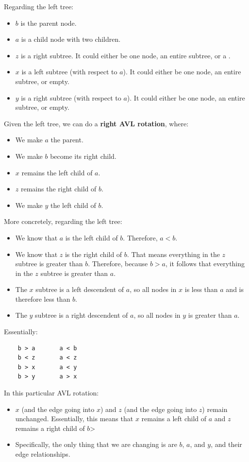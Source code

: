 \documentclass[letterpaper]{article}
\begin{document}
Regarding the left tree: 
\begin{itemize}
    \item $b$ is the parent node. 
    \item $a$ is a child node with two children. 
    \item $z$ is a right subtree. It could either be one node, an entire subtree, or a . 
    \item $x$ is a left subtree (with respect to $a$). It could either be one node, an entire subtree, or empty. 
    \item $y$ is a right subtree (with respect to $a$). It could either be one node, an entire subtree, or empty. 
\end{itemize}
Given the left tree, we can do a \textbf{right AVL rotation}, where: 
\begin{itemize}
    \item We make $a$ the parent. 
    \item We make $b$ become its right child. 
    \item $x$ remains the left child of $a$. 
    \item $z$ remains the right child of $b$. 
    \item We make $y$ the left child of $b$. 
\end{itemize}
More concretely, regarding the left tree: 
\begin{itemize}
    \item We know that $a$ is the left child of $b$. Therefore, $a < b$. 
    \item We know that $z$ is the right child of $b$. That means everything in the $z$ subtree is greater than $b$. Therefore, because $b > a$, it follows that everything in the $z$ subtree is greater than $a$. 
    \item The $x$ subtree is a left descendent of $a$, so all nodes in $x$ is less than $a$ and is therefore less than $b$. 
    \item The $y$ subtree is a right descendent of $a$, so all nodes in $y$ is greater than $a$. 
\end{itemize}
Essentially: 
\begin{verbatim}
    b > a       a < b 
    b < z       a < z
    b > x       a < y
    b > y       a > x
\end{verbatim}
In this particular AVL rotation: 
\begin{itemize}
    \item $x$ (and the edge going into $x$) and $z$ (and the edge going into $z$) remain unchanged. Essentially, this means that $x$ remains a left child of $a$ and $z$ remains a right child of $b$>
    \item Specifically, the only thing that we are changing is are $b$, $a$, and $y$, and their edge relationships. 
\end{itemize}
\end{document}
